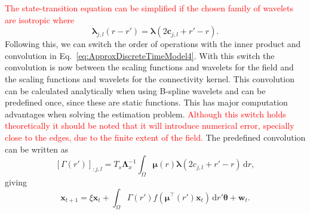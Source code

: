 \documentclass[review,authoryear,3p]{elsarticle}
\newcommand{\parham}[1]{\textcolor{red}{#1}}
\begin{document}
\parham{The state-transition equation can be simplified if the chosen family of wavelets are isotropic where}
\begin{equation}
	\boldsymbol{\lambda}_{j,l}(r-r') = \boldsymbol{\lambda}(2\mathbf{c}_{j,l}+r'-r). 
\end{equation}
Following this, we can switch the order of operations with the inner product and convolution in Eq.~\eqref{eq:ApproxDiscreteTimeModel4}. With this switch the convolution is now between the scaling functions and wavelets for the field and the scaling functions and wavelets for the connectivity kernel. This convolution can be calculated analytically when using B-spline wavelets and can be predefined once, since these are static functions. This has major computation advantages when solving the estimation problem. \parham{Although this switch holds theoretically it should be noted that it will introduce numerical error, specially close to the edges, due to the finite extent of the field. } The predefined convolution can be written as
\begin{equation}\label{eq:Gammaij}
	\left[\Gamma(r')\right]_{:j,l} = T_s \mathbf{\Lambda}_{x}^{-1}\int_{\Omega} \boldsymbol\mu\left(r\right)\boldsymbol\lambda\left(2c_{j,l} + r'-r\right) \,\mathrm{d}r,
\end{equation}
giving
\begin{equation}
	\mathbf{x}_{t+1} = 
	\xi \mathbf{x}_t + 
	\int_{\Omega} \Gamma\left(r'\right)f\left(\boldsymbol\mu^\top\left(r'\right) \mathbf{x}_t\right) 
	\, \mathrm{d}r' \boldsymbol\theta
	+ \mathbf w_t.
\end{equation}
\end{document}

